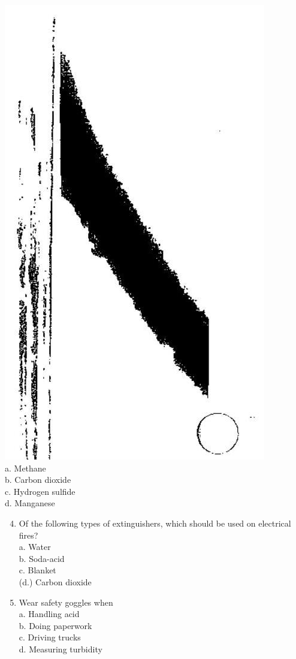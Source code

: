 \documentclass[10pt]{article}
\begin{document}
\includegraphics[max width=\textwidth]{2022_11_11_ca6a6c1a0324ee23e523g-38}\\
a. Methane\\
b. Carbon dioxide\\
c. Hydrogen sulfide\\
d. Manganese

\begin{enumerate}
  \setcounter{enumi}{3}
  \item Of the following types of extinguishers, which should be used on electrical fires?\\
a. Water\\
b. Soda-acid\\
c. Blanket\\
(d.) Carbon dioxide

  \item Wear safety goggles when\\
a. Handling acid\\
b. Doing paperwork\\
c. Driving trucks\\
d. Measuring turbidity

\end{enumerate}
\end{document}
